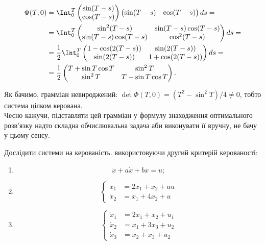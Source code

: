 \begin{solution}
    \begin{align*} 
        \Phi(T, 0) &= \Int_0^T \begin{pmatrix}  \sin(T - s) \\ \cos(T - s) \end{pmatrix} \begin{pmatrix} \sin(T - s) & \cos(T - s) \end{pmatrix} ds = \\
        &= \Int_0^T \begin{pmatrix}  \sin^2(T - s) & \sin(T - s)\cos(T - s) \\ \sin(T - s)\cos(T - s) & \cos^2(T - s) \end{pmatrix} ds = \\
        &= \dfrac12 \Int_0^T \begin{pmatrix}  1-\cos(2(T - s)) & \sin(2(T - s)) \\ \sin(2(T - s)) & 1 + \cos(2(T - s)) \end{pmatrix} ds = \\
        &= \dfrac12 \begin{pmatrix}  T + \sin T \cos T & \sin^2 T \\ \sin^2 T & T - \sin T\cos T \end{pmatrix}.
    \end{align*}
    
    Як бачимо, грамміан невироджений: $\det \Phi(T, 0) = (T^2 - \sin^2 T) /4 \ne 0$, тобто система цілком керована.\\
    
    Чесно кажучи, підставляти цей грамміан у формулу знаходження оптимального розв'язку надто складна обчислювальна задача аби виконувати її вручну, не бачу у цьому сенсу.
\end{solution}

\setcounter{problem}{6}

\begin{problem}
    Дослідити системи на керованість. використовуючи другий критерій керованості:
    \begin{enumerate}
        \item \[\ddot x + a \dot x + b x = u; \]
        \item \[ \left\{ \begin{aligned} \dot x_1 &= 2x_1 + x_2 + au \\ \dot x_2 &= x_1 + 4 x_2 + u \end{aligned} \right. \]
        \item \[ \left\{ \begin{aligned} \dot x_1 &= 2x_1 + x_2 + u_1 \\ \dot x_2 &= x_1 + 3 x_3 + u_2 \\ \dot x_3 &= x_2 + x_3 + u_2  \end{aligned} \right. \]
    \end{enumerate}
    
\end{problem}

